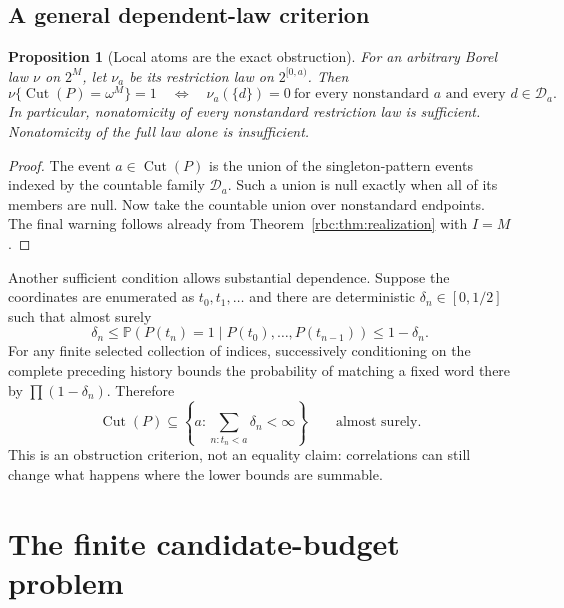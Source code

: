 \documentclass[11pt]{article}
\numberwithin{equation}{section}
\newtheorem{proposition}[theorem]{Proposition}
\theoremstyle{definition}
\theoremstyle{remark}
\newcommand{\std}{\omega^M}
\newcommand{\Cut}{\operatorname{Cut}}
\newcommand{\Prob}{\mathbb P}
\newcommand{\coded}{\mathcal D}
\begin{document}
\subsection{A general dependent-law criterion}

\begin{proposition}[Local atoms are the exact obstruction]
\label{rbc:prop:dependent-atoms}
For an arbitrary Borel law $\nu$ on $2^M$, let $\nu_a$ be its restriction
law on $2^{[0,a)}$. Then
\[
 \nu\{\Cut(P)=\std\}=1
 \quad\Longleftrightarrow\quad
 \nu_a(\{d\})=0\ \text{for every nonstandard }a
                   \text{ and every }d\in\coded_a.
\]
In particular, nonatomicity of every nonstandard restriction law is
sufficient. Nonatomicity of the full law alone is insufficient.
\end{proposition}

\begin{proof}
The event $a\in\Cut(P)$ is the union of the singleton-pattern events
indexed by the countable family $\coded_a$. Such a union is null exactly
when all of its members are null. Now take the countable union over
nonstandard endpoints. The final warning follows already from
Theorem~\ref{rbc:thm:realization} with $I=M$.
\end{proof}

Another sufficient condition allows substantial dependence. Suppose the
coordinates are enumerated as $t_0,t_1,\ldots$ and there are deterministic
$\delta_n\in[0,1/2]$ such that almost surely
\[
 \delta_n\le\Prob(P(t_n)=1\mid P(t_0),\ldots,P(t_{n-1}))
            \le1-\delta_n.
\]
For any finite selected collection of indices, successively conditioning
on the complete preceding history bounds the probability of matching a
fixed word there by $\prod(1-\delta_n)$. Therefore
\[
 \Cut(P)\subseteq
 \left\{a:\sum_{n:t_n<a}\delta_n<\infty\right\}
 \qquad\text{almost surely}.
\]
This is an obstruction criterion, not an equality claim: correlations
can still change what happens where the lower bounds are summable.





\section{The finite candidate-budget problem}
\label{rbc:sec:finite-budget}
\end{document}
